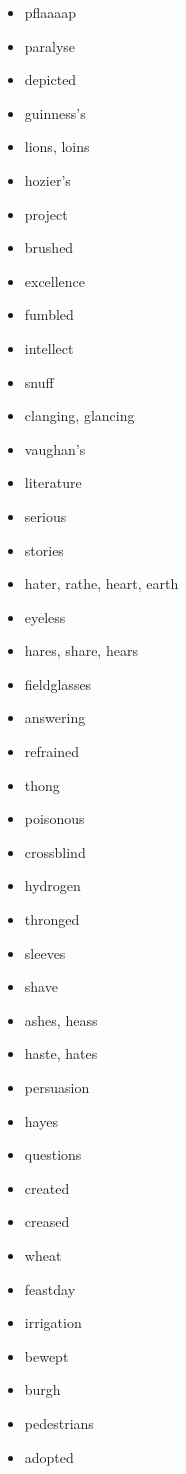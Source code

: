 \documentclass{article}
\begin{document}
\begin{itemize}
    \item pflaaaap
    \item paralyse
    \item depicted
    \item guinness's
    \item lions, loins
    \item hozier's
    \item project
    \item brushed
    \item excellence
    \item fumbled
    \item intellect
    \item snuff
    \item clanging, glancing
    \item vaughan's
    \item literature
    \item serious
    \item stories
    \item hater, rathe, heart, earth
    \item eyeless
    \item hares, share, hears
    \item fieldglasses
    \item answering
    \item refrained
    \item thong
    \item poisonous
    \item crossblind
    \item hydrogen
    \item thronged
    \item sleeves
    \item shave
    \item ashes, heass
    \item haste, hates
    \item persuasion
    \item hayes
    \item questions
    \item created
    \item creased
    \item wheat
    \item feastday
    \item irrigation
    \item bewept
    \item burgh
    \item pedestrians
    \item adopted

\end{itemize}
\end{document}
